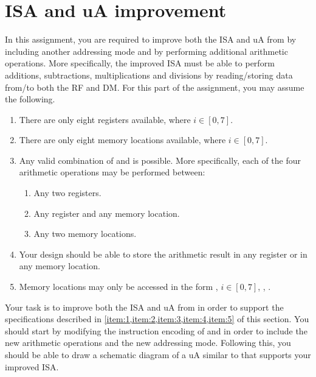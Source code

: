 \documentclass[number=03]{assignment}
\begin{document}
\section{\ac{ISA} and \ac{uA} improvement}\label{Sec:ISA_Improvement}
In this assignment, you are required to improve both the \ac{ISA} and \ac{uA} from  by including another addressing mode and by performing additional arithmetic operations.
More specifically, the improved \ac{ISA} must be able to perform additions, subtractions, multiplications and divisions by reading/storing data from/to both the \ac{RF} and \ac{DM}.
For this part of the assignment, you may assume the following.
\begin{enumerate} 
  \item There are only eight registers  available, where $i\in[0,7]$.\label{item:1} 
  \item There are only eight memory locations  available, where $i\in[0,7]$.\label{item:2}
  \item Any valid combination of  and  is possible.\label{item:3}
  More specifically, each of the four arithmetic operations may be performed between:
  \begin{enumerate}
  \item Any two registers.
  \item Any register and any memory location.
  \item Any two memory locations.
  \end{enumerate}  
   \item Your design should be able to store the arithmetic result in any register or in any memory location.\label{item:4}
   \item Memory locations may only be accessed in the form , $i \in [0,7]$, \ie, .\label{item:5}
\end{enumerate}

Your task is to improve both the \ac{ISA} and \ac{uA} from  in order to support the specifications described in \cref{item:1,item:2,item:3,item:4,item:5} of this section.
You should start by modifying the instruction encoding of  and  in order to include the new arithmetic operations and the new addressing mode.
Following this, you should be able to draw a schematic diagram of a \ac{uA} similar to  that supports your improved \ac{ISA}. 
%
\end{document}
